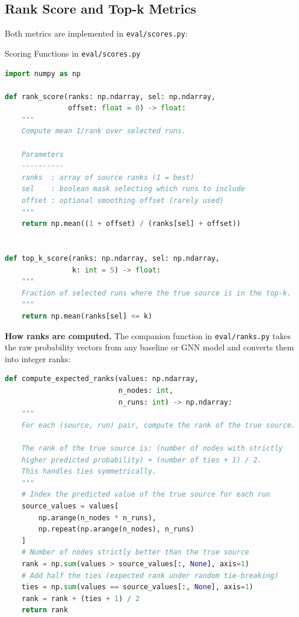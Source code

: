 \subsection{Rank Score and Top-k Metrics}

Both metrics are implemented in \texttt{eval/scores.py}:

\begin{codewalk}{Scoring Functions in \texttt{eval/scores.py}}
\begin{lstlisting}[language=Python]
import numpy as np

def rank_score(ranks: np.ndarray, sel: np.ndarray,
               offset: float = 0) -> float:
    """
    Compute mean 1/rank over selected runs.

    Parameters
    ----------
    ranks  : array of source ranks (1 = best)
    sel    : boolean mask selecting which runs to include
    offset : optional smoothing offset (rarely used)
    """
    return np.mean((1 + offset) / (ranks[sel] + offset))


def top_k_score(ranks: np.ndarray, sel: np.ndarray,
                k: int = 5) -> float:
    """
    Fraction of selected runs where the true source is in the top-k.
    """
    return np.mean(ranks[sel] <= k)
\end{lstlisting}

\textbf{How ranks are computed.} The companion function in \texttt{eval/ranks.py}
takes the raw probability vectors from any baseline or GNN model and converts them
into integer ranks:

\begin{lstlisting}[language=Python]
def compute_expected_ranks(values: np.ndarray,
                           n_nodes: int,
                           n_runs: int) -> np.ndarray:
    """
    For each (source, run) pair, compute the rank of the true source.

    The rank of the true source is: (number of nodes with strictly
    higher predicted probability) + (number of ties + 1) / 2.
    This handles ties symmetrically.
    """
    # Index the predicted value of the true source for each run
    source_values = values[
        np.arange(n_nodes * n_runs),
        np.repeat(np.arange(n_nodes), n_runs)
    ]
    # Number of nodes strictly better than the true source
    rank = np.sum(values > source_values[:, None], axis=1)
    # Add half the ties (expected rank under random tie-breaking)
    ties = np.sum(values == source_values[:, None], axis=1)
    rank = rank + (ties + 1) / 2
    return rank
\end{lstlisting}


\end{codewalk}
